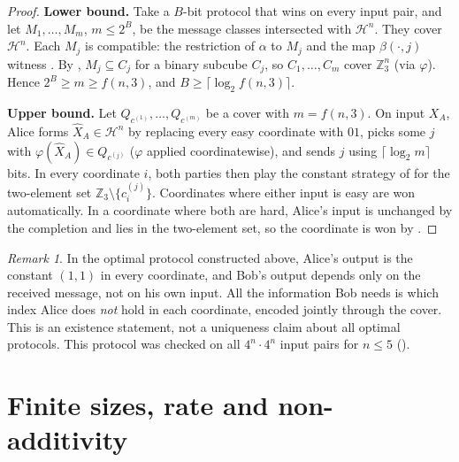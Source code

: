 \documentclass[12pt,a4paper]{article}
\theoremstyle{definition}
\theoremstyle{remark}
\newtheorem{remark}[theorem]{Remark}
\newcommand{\Z}{\mathbb{Z}}
\newcommand{\Hd}{\mathcal{H}}   %
\begin{document}
\begin{proof}
\textbf{Lower bound.} Take a $B$-bit protocol that wins on every input pair, and let $M_1,\dots,M_m$, $m\le2^B$, be the message classes intersected with $\Hd^n$. They cover $\Hd^n$. Each $M_j$ is compatible: the restriction of $\alpha$ to $M_j$ and the map $\beta(\cdot,j)$ witness . By , $M_j\subseteq C_j$ for a binary subcube $C_j$, so $C_1,\dots,C_m$ cover $\Z_3^n$ (via $\varphi$). Hence $2^B\ge m\ge f(n,3)$, and $B\ge\lceil\log_2 f(n,3)\rceil$.

\textbf{Upper bound.} Let $Q_{c^{(1)}},\dots,Q_{c^{(m)}}$ be a cover with $m=f(n,3)$. On input $X_A$, Alice forms $\hat X_A\in\Hd^n$ by replacing every easy coordinate with $01$, picks some $j$ with $\varphi(\hat X_A)\in Q_{c^{(j)}}$ ($\varphi$ applied coordinatewise), and sends $j$ using $\lceil\log_2 m\rceil$ bits. In every coordinate $i$, both parties then play the constant strategy of  for the two-element set $\Z_3\setminus\{c^{(j)}_i\}$. Coordinates where either input is easy are won automatically. In a coordinate where both are hard, Alice's input is unchanged by the completion and lies in the two-element set, so the coordinate is won by .
\end{proof}

\begin{remark}
\label{rem:structure}
In the optimal protocol constructed above, Alice's output is the constant $(1,1)$ in every coordinate, and Bob's output depends only on the received message, not on his own input. All the information Bob needs is which index Alice does \emph{not} hold in each coordinate, encoded jointly through the cover. This is an existence statement, not a uniqueness claim about all optimal protocols. This protocol was checked on all $4^n\cdot4^n$ input pairs for $n\le5$ ().
\end{remark}

\section{Finite sizes, rate and non-additivity}
\label{sec:finite}
\end{document}
